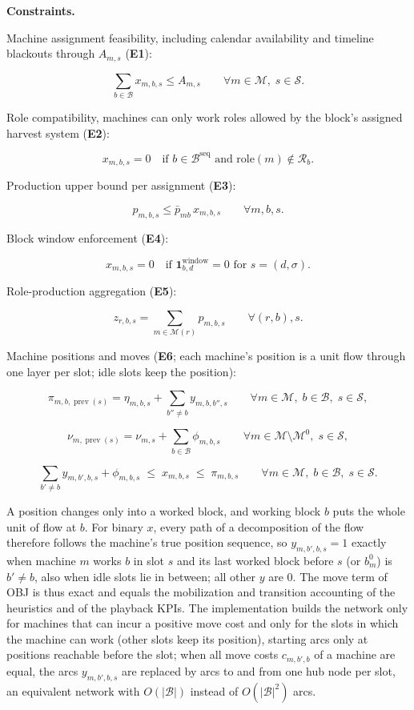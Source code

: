 \textbf{Constraints.}

Machine assignment feasibility, including calendar availability and
timeline blackouts through \(A_{m,s}\) (\textbf{E1}):

\[
\sum_{b\in\mathcal{B}} x_{m,b,s} \le A_{m,s}
\qquad \forall m\in\mathcal{M},\; s\in\mathcal{S}.
\]

Role compatibility, machines can only work roles allowed by the block's
assigned harvest system (\textbf{E2}):

\[
x_{m,b,s}=0 \quad \text{if } b\in\mathcal{B}^{\text{seq}} \text{ and role}(m)\notin\mathcal{R}_b.
\]

Production upper bound per assignment (\textbf{E3}):

\[
p_{m,b,s} \le \bar{p}_{mb}\,x_{m,b,s}
\qquad \forall m,b,s.
\]

Block window enforcement (\textbf{E4}):

\[
x_{m,b,s}=0 \quad \text{if } \mathbf{1}^{\text{window}}_{b,d}=0 \text{ for } s=(d,\sigma).
\]

Role-production aggregation (\textbf{E5}):

\[
z_{r,b,s} = \sum_{m\in\mathcal{M}(r)} p_{m,b,s}
\qquad \forall (r,b), s.
\]

Machine positions and moves (\textbf{E6}; each machine's position is a
unit flow through one layer per slot; idle slots keep the position):

\[
\pi_{m,b,\operatorname{prev}(s)} = \eta_{m,b,s} + \sum_{b''\ne b} y_{m,b,b'',s}
\qquad \forall m\in\mathcal{M},\; b\in\mathcal{B},\; s\in\mathcal{S},
\]

\[
\nu_{m,\operatorname{prev}(s)} = \nu_{m,s} + \sum_{b\in\mathcal{B}} \phi_{m,b,s}
\qquad \forall m\in\mathcal{M}\setminus\mathcal{M}^{0},\; s\in\mathcal{S},
\]

\[
\sum_{b'\ne b} y_{m,b',b,s} + \phi_{m,b,s} \;\le\; x_{m,b,s} \;\le\; \pi_{m,b,s}
\qquad \forall m\in\mathcal{M},\; b\in\mathcal{B},\; s\in\mathcal{S}.
\]

A position changes only into a worked block, and working block \(b\)
puts the whole unit of flow at \(b\). For binary \(x\), every path of a
decomposition of the flow therefore follows the machine's true position
sequence, so \(y_{m,b',b,s}=1\) exactly when machine \(m\) works \(b\)
in slot \(s\) and its last worked block before \(s\) (or \(b^{0}_m\)) is
\(b'\ne b\), also when idle slots lie in between; all other \(y\) are 0.
The move term of OBJ is thus exact and equals the mobilization and
transition accounting of the heuristics and of the playback KPIs. The
implementation builds the network only for machines that can incur a
positive move cost and only for the slots in which the machine can work
(other slots keep its position), starting arcs only at positions
reachable before the slot; when all move costs \(c_{m,b',b}\) of a
machine are equal, the arcs \(y_{m,b',b,s}\) are replaced by arcs to and
from one hub node per slot, an equivalent network with
\(O(|\mathcal{B}|)\) instead of \(O(|\mathcal{B}|^2)\) arcs.

